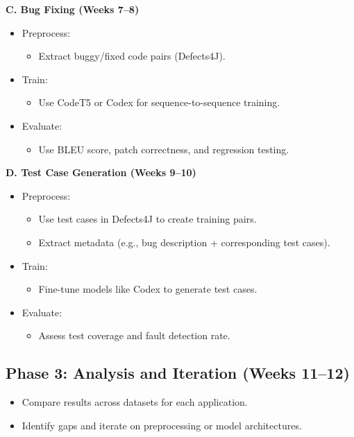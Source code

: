 \documentclass[12pt]{article}
\begin{document}
\textbf{C. Bug Fixing (Weeks 7--8)}
\begin{itemize}
    \item Preprocess:
    \begin{itemize}
        \item Extract buggy/fixed code pairs (Defects4J).
    \end{itemize}
    \item Train:
    \begin{itemize}
        \item Use CodeT5 or Codex for sequence-to-sequence training.
    \end{itemize}
    \item Evaluate:
    \begin{itemize}
        \item Use BLEU score, patch correctness, and regression testing.
    \end{itemize}
\end{itemize}

\textbf{D. Test Case Generation (Weeks 9--10)}
\begin{itemize}
    \item Preprocess:
    \begin{itemize}
        \item Use test cases in Defects4J to create training pairs.
        \item Extract metadata (e.g., bug description + corresponding test cases).
    \end{itemize}
    \item Train:
    \begin{itemize}
        \item Fine-tune models like Codex to generate test cases.
    \end{itemize}
    \item Evaluate:
    \begin{itemize}
        \item Assess test coverage and fault detection rate.
    \end{itemize}
\end{itemize}

\subsection*{Phase 3: Analysis and Iteration (Weeks 11--12)}
\begin{itemize}
    \item Compare results across datasets for each application.
    \item Identify gaps and iterate on preprocessing or model architectures.
\end{itemize}
\end{document}
